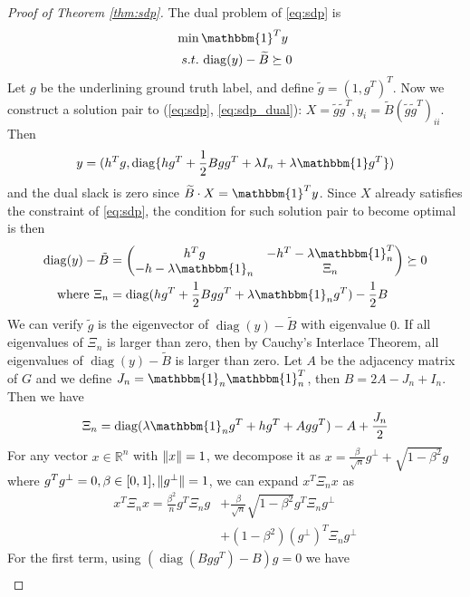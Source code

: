 \documentclass[conference]{IEEEtran}
\DeclarePairedDelimiter\norm{\lVert}{\rVert}
\DeclareMathOperator{\diag}{diag}
\begin{document}
\begin{proof}[Proof of Theorem \ref{thm:sdp}]
The dual problem of \eqref{eq:sdp} is
\begin{align}
\min\, & \mathbbm{1}^T y \notag \\
s.t.\,& \diag(y) - \widetilde{B} \succeq 0
\label{eq:sdp_dual}
\end{align}
Let $g$ be the underlining ground truth label, and
define $\tilde{g} = (1,g^T)^T$.
Now we construct a solution pair to (\ref{eq:sdp}, \ref{eq:sdp_dual}): $X=\tilde{g}\tilde{g}^T, y_i = \tilde{B}(\tilde{g}\tilde{g}^T)_{ii}$.
Then $$
y = (h^T g, \diag\{hg^T+\frac{1}{2}Bgg^T + \lambda I_n + \lambda \mathbbm{1}g^T\})
$$
and the dual slack is zero since $\widetilde{B} \cdot X = \mathbbm{1}^T y $.
Since $X$ already satisfies the constraint of \eqref{eq:sdp}, the condition for such solution pair to become optimal is then
\begin{align}
\diag(y) - \tilde{B} & = \begin{pmatrix} h^T g & -h^T - \lambda \mathbbm{1}_n^T \\ -h- \lambda \mathbbm{1}_n & \Xi_n \end{pmatrix}
\succeq 0 \notag \\
\textrm{ where }\Xi_n & = \diag(hg^T + \frac{1}{2}Bgg^T + \lambda \mathbbm{1}_ng^T) - \frac{1}{2}B
\end{align}
We can verify $\tilde{g}$ is the eigenvector of $\diag(y) - \tilde{B}$ with eigenvalue $0$.
If all eigenvalues of $\Xi_n$ is larger than zero, then by
Cauchy's Interlace Theorem, all eigenvalues of $\diag(y) - \tilde{B}$ is larger than zero.
Let $A$ be the adjacency matrix of $G$
and we define $J_n = \mathbbm{1}_n \mathbbm{1}_n^T $, then $B=2A-J_n+I_n$.
Then we have
\begin{equation}\label{eq:Xi_n}
\Xi_n = \diag(\lambda \mathbbm{1}_n g^T + hg^T + Agg^T) - A + \frac{J_n}{2}
\end{equation}
For any vector $x \in \mathbb{R}^n$ with $\norm{x}=1$, we decompose it as $x=\frac{\beta}{\sqrt{n}} g^{\perp}
+ \sqrt{1-\beta^2} g$ where $g^Tg^{\perp}=0, \beta \in [0,1], \norm{g^{\perp}}=1$, we can expand $x^T \Xi_n x$ as
\begin{align*}
x^T \Xi_n x = \frac{\beta^2}{n} g^T \Xi_n g  &
+		\frac{\beta}{\sqrt{n}}\sqrt{1-\beta^2} g^T \Xi_n g^{\perp}
\\
&+
(1-\beta^2)(g^{\perp})^T \Xi_n g^{\perp} 
\end{align*}
For the first term, using $(\diag(Bgg^T) - B)g=0$ we have
\begin{align*}

\end{align*}
\end{proof}
\end{document}
